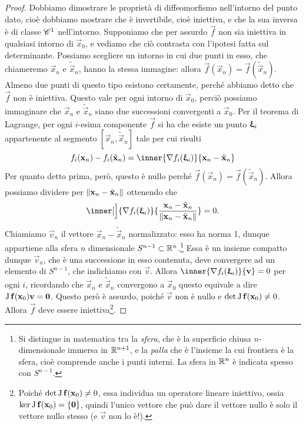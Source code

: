 \begin{proof}
	Dobbiamo dimostrare le proprietà di diffeomorfismo nell'intorno del punto dato, cioè dobbiamo mostrare che è invertibile, cioè iniettiva, e che la sua inversa è di classe $\cclass[1]$ nell'intorno.
	Supponiamo che per assurdo $\vec f$ non sia iniettiva in qualsiasi intorno di $\vec x_0$, e vediamo che ciò contrasta con l'ipotesi fatta sul determinante.
	Possiamo scegliere un intorno in cui due punti in esso, che chiameremo $\vec x_n$ e $\tilde{\vec x}_n$, hanno la stessa immagine: allora $\vec f(\vec x_n)=\vec f(\tilde{\vec x}_n)$.
	Almeno due punti di questo tipo esistono certamente, perch\'e abbiamo detto che $\vec f$ non è iniettiva.
	Questo vale per ogni intorno di $\vec x_0$, perciò possiamo immaginare che $\vec x_n$ e $\tilde{\vec x}_n$ siano due successioni convergenti a $\vec x_0$.
	Per il teorema di Lagrange, per ogni $i$-esima componente $\vec f$ si ha che esiste un punto $\vxi_i$ appartenente al segmento $[\vec x_n, \tilde{\vec x}_n]$ tale per cui risulti
	\begin{equation}
		f_i(\vec x_n)-f_i(\tilde{\vec x}_n)=\inner{\grad f_i(\vxi_i)}{\vec x_n-\tilde{\vec x}_n}
		\label{eq:lagrange-in-diffeomorfismo-locale}
	\end{equation}
	Per quanto detto prima, però, questo è nullo perché $\vec f(\vec x_n)=\vec f(\tilde{\vec x}_n)$.
	Allora possiamo dividere per $\norm{\vec x_n-\tilde{\vec x}_n}$ ottenendo che
	\begin{equation}
		\inner[\Big]{\grad f_i(\vxi_i)}{\frac{\vec x_n-\tilde{\vec x}_n}{\norm{\vec x_n-\tilde{\vec x}_n}}}=0.
		\label{eq:vettori-ortogonali-diffeomorfismo}
	\end{equation}
	Chiamiamo $\vec v_n$ il vettore $\vec x_n-\tilde{\vec x}_n$ normalizzato: esso ha norma 1, dunque appartiene alla sfera $n$ dimensionale $S^{n-1}\subset\R^n$.\footnote{Si distingue in matematica tra la \emph{sfera}, che è la superficie chiusa $n$-dimensionale immersa in $\R^{n+1}$, e la \emph{palla} che è l'insieme la cui frontiera è la sfera, cioè comprende anche i punti interni. La sfera in $\R^n$ è indicata spesso con $S^{n-1}$.}
	Essa è un insieme compatto dunque $\vec v_n$, che è una successione in esso contenuta, deve convergere ad un elemento di $S^{n-1}$, che indichiamo con $\vec v$.
	Allora $\inner{\grad f_i(\vxi_i)}{\vec v}=0$ per ogni $i$, ricordando che $\vec x_n$ e $\tilde{\vec x}_n$ convergono a $\vec x_0$ questo equivale a dire $\jac\vec f(\vec x_0)\vec v=\vec 0$.
	Questo però è assurdo, poiché $\vec v$ non è nullo e $\det\jac\vec f(\vec x_0)\neq 0$.
	Allora $\vec f$ deve essere iniettiva\footnote{Poiché $\det\jac\vec f(\vec x_0)\neq 0$, essa individua un operatore lineare iniettivo, ossia $\ker\jac\vec f(\vec x_0)=\{\vec 0\}$, quindi l'unico vettore che può dare il vettore nullo è solo il vettore nullo stesso (e $\vec v$ non lo è!).}.


\end{proof}
